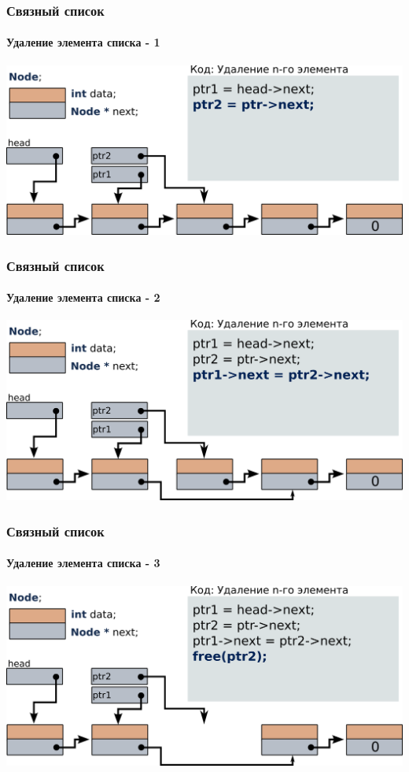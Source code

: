 \documentclass[12pt,pdf,hyperref={unicode}]{beamer}
\begin{document}
\begin{frame}[fragile]
\frametitle{Связный список} 
\framesubtitle{Удаление элемента списка - 1} 
\begin{center}
\includegraphics[width=0.99\linewidth]{images/list_delete_1.png}
\end{center}
\end{frame}
\begin{frame}[fragile]
\frametitle{Связный список} 
\framesubtitle{Удаление элемента списка - 2} 
\begin{center}
\includegraphics[width=0.99\linewidth]{images/list_delete_2.png}
\end{center}
\end{frame}
\begin{frame}[fragile]
\frametitle{Связный список} 
\framesubtitle{Удаление элемента списка - 3} 
\begin{center}
\includegraphics[width=0.99\linewidth]{images/list_delete_3.png}
\end{center}
\end{frame}
\end{document}
